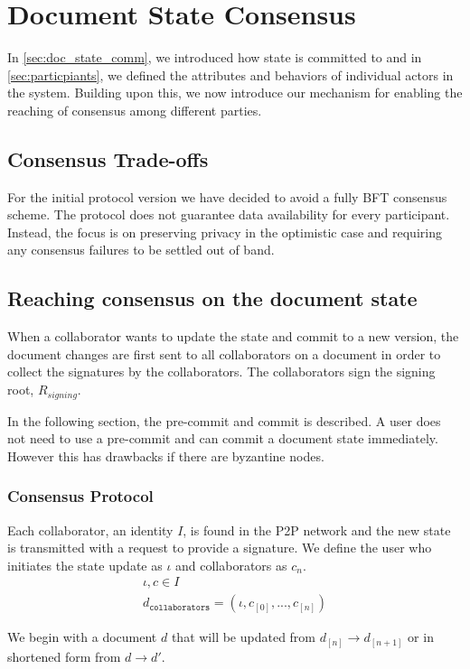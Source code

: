\section{Document State Consensus}
\label{sec:consensus}
In \ref{sec:doc_state_comm}, we introduced how state is committed to and in \ref{sec:particpiants}, we defined the attributes and behaviors of individual actors in the system. Building upon this, we now introduce our mechanism for enabling the reaching of consensus among different parties.
\subsection{Consensus Trade-offs}
For the initial protocol version we have decided to avoid a fully BFT consensus scheme. The protocol does not guarantee data availability for every participant. Instead, the focus is on preserving privacy in the optimistic case and requiring any consensus failures to be settled out of band. 
\subsection{Reaching consensus on the document state}\label{sec:reach_consensus}
When a collaborator wants to update the state and commit to a new version, the document changes are first sent to all collaborators on a document in order to collect the signatures by the collaborators. The collaborators sign the signing root, $R_{signing}$.

In the following section, the pre-commit and commit is described. A user does not need to use a pre-commit and can commit a document state immediately. However this has drawbacks if there are byzantine nodes.

\subsubsection{Consensus Protocol}
Each collaborator, an identity $I$, is found in the P2P network and the new state is transmitted with a request to provide a signature. We define the user who initiates the state update as $\iota$ and collaborators as $c_n$.
\begin{eqnarray}
\iota,c \in I\\
     d_{\mathtt{collaborators}} = (\iota, c_{[0]}, ..., c_{[n]})
\end{eqnarray}

We begin with a document $d$ that will be updated from $d_{[n]} \to d_{[n+1]}$ or in shortened form from $d \to d'$. 

